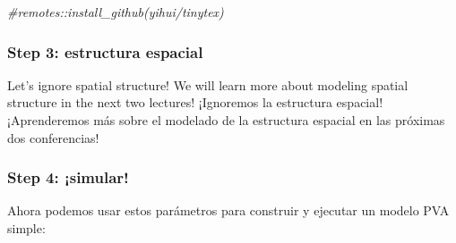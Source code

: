 \documentclass[
]{article}
\newenvironment{Shaded}{\begin{snugshade}}{\end{snugshade}}
\newcommand{\CommentTok}[1]{\textcolor[rgb]{0.56,0.35,0.01}{\textit{#1}}}
\begin{document}
\begin{Shaded}
\begin{Highlighting}[]
\CommentTok{\#remotes::install\_github(\textquotesingle{}yihui/tinytex\textquotesingle{})}
\end{Highlighting}
\end{Shaded}

\hypertarget{step-3-estructura-espacial}{%
\subsubsection{Step 3: estructura
espacial}\label{step-3-estructura-espacial}}

Let's ignore spatial structure! We will learn more about modeling
spatial structure in the next two lectures! ¡Ignoremos la estructura
espacial! ¡Aprenderemos más sobre el modelado de la estructura espacial
en las próximas dos conferencias!

\hypertarget{step-4-simular}{%
\subsubsection{Step 4: ¡simular!}\label{step-4-simular}}

Ahora podemos usar estos parámetros para construir y ejecutar un modelo
PVA simple:
\end{document}
